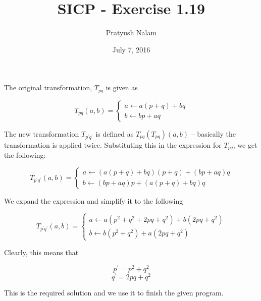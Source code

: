 \documentclass[a4paper]{article}
\title{SICP - Exercise 1.19}
\author{Pratyush Nalam}
\date{July 7, 2016}
\begin{document}
	\maketitle
	
	The original transformation, $T_{pq}$ is given as
	
	\[
	T_{pq}(a,b)=
	\begin{cases}
	a\leftarrow a(p+q)+bq\\
	b\leftarrow bp+aq
	\end{cases}
	\]
	
	The new transformation $T_{p^\prime q^\prime}$ is defined as $T_{pq}(T_{pq})(a,b)$ -- basically the transformation is applied twice. Substituting this in the expression for $T_{pq}$, we get the following:
	
	\[
	T_{p^\prime q^\prime}(a,b)=
	\begin{cases}
	a\leftarrow (a(p+q)+bq)(p+q)+(bp+aq)q\\
	b\leftarrow (bp+aq)p+(a(p+q)+bq)q
	\end{cases}
	\]
	
	We expand the expression and simplify it to the following
	
	\[
	T_{p^\prime q^\prime}(a,b)=
	\begin{cases}
	a\leftarrow a(p^2+q^2+2pq+q^2)+b(2pq+q^2)\\
	b\leftarrow b(p^2+q^2)+a(2pq+q^2)
	\end{cases}
	\]
	
	Clearly, this means that
	
	\[
	p^\prime=p^2+q^2
	\]
	\[
	q^\prime=2pq+q^2
	\]
	
	This is the required solution and we use it to finish the given program.
	
\end{document}
